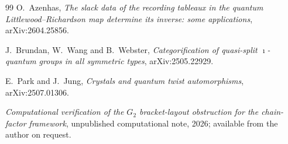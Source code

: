\documentclass[11pt]{article}
\theoremstyle{definition}
\theoremstyle{remark}
\begin{document}
\begin{thebibliography}{99}
O.~Azenhas,
\emph{The slack data of the recording tableaux in the quantum Littlewood--Richardson map
determine its inverse: some applications},
arXiv:2604.25856.

J.~Brundan, W.~Wang and B.~Webster,
\emph{Categorification of quasi-split $\imath$-quantum groups in all symmetric types},
arXiv:2505.22929.

E.~Park and J.~Jung,
\emph{Crystals and quantum twist automorphisms},
arXiv:2507.01306.

\emph{Computational verification of the $G_2$ bracket-layout obstruction for
the chain-factor framework}, unpublished computational note, 2026; available
from the author on request.

\end{thebibliography}
\end{document}

